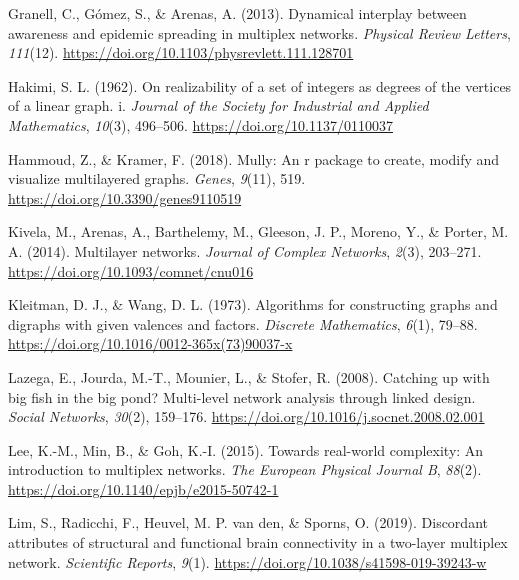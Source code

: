\documentclass[
]{article}
\newlength{\cslhangindent}
\newlength{\cslentryspacingunit} %
\newenvironment{CSLReferences}[2] %
 {%
  \setlength{\parindent}{0pt}
  \ifodd #1
  \let\oldpar\par
  \def\par{\hangindent=\cslhangindent\oldpar}
  \fi
  \setlength{\parskip}{#2\cslentryspacingunit}
 }%
 {}
\begin{document}
\begin{CSLReferences}{1}{0}
\leavevmode{}%
Granell, C., Gómez, S., \& Arenas, A. (2013). Dynamical interplay
between awareness and epidemic spreading in multiplex networks.
\emph{Physical Review Letters}, \emph{111}(12).
\url{https://doi.org/10.1103/physrevlett.111.128701}

\leavevmode{}%
Hakimi, S. L. (1962). On realizability of a set of integers as degrees
of the vertices of a linear graph. i. \emph{Journal of the Society for
Industrial and Applied Mathematics}, \emph{10}(3), 496--506.
\url{https://doi.org/10.1137/0110037}

\leavevmode{}%
Hammoud, Z., \& Kramer, F. (2018). Mully: An r package to create, modify
and visualize multilayered graphs. \emph{Genes}, \emph{9}(11), 519.
\url{https://doi.org/10.3390/genes9110519}

\leavevmode{}%
Kivela, M., Arenas, A., Barthelemy, M., Gleeson, J. P., Moreno, Y., \&
Porter, M. A. (2014). Multilayer networks. \emph{Journal of Complex
Networks}, \emph{2}(3), 203--271.
\url{https://doi.org/10.1093/comnet/cnu016}

\leavevmode{}%
Kleitman, D. J., \& Wang, D. L. (1973). Algorithms for constructing
graphs and digraphs with given valences and factors. \emph{Discrete
Mathematics}, \emph{6}(1), 79--88.
\url{https://doi.org/10.1016/0012-365x(73)90037-x}

\leavevmode{}%
Lazega, E., Jourda, M.-T., Mounier, L., \& Stofer, R. (2008). Catching
up with big fish in the big pond? Multi-level network analysis through
linked design. \emph{Social Networks}, \emph{30}(2), 159--176.
\url{https://doi.org/10.1016/j.socnet.2008.02.001}

\leavevmode{}%
Lee, K.-M., Min, B., \& Goh, K.-I. (2015). Towards real-world
complexity: An introduction to multiplex networks. \emph{The European
Physical Journal B}, \emph{88}(2).
\url{https://doi.org/10.1140/epjb/e2015-50742-1}

\leavevmode{}%
Lim, S., Radicchi, F., Heuvel, M. P. van den, \& Sporns, O. (2019).
Discordant attributes of structural and functional brain connectivity in
a two-layer multiplex network. \emph{Scientific Reports}, \emph{9}(1).
\url{https://doi.org/10.1038/s41598-019-39243-w}


\end{CSLReferences}
\end{document}
